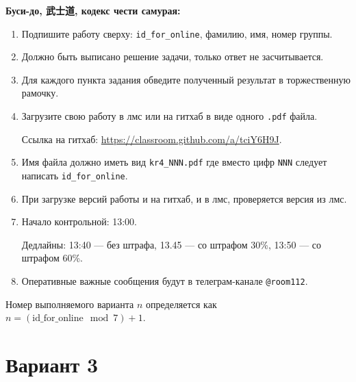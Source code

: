 \documentclass[12pt]{article}
\newcommand \id {\mathrm{id}\_\mathrm{for}\_\mathrm{online}}
\begin{document}
\textbf{Буси-до, 武士道, кодекс чести самурая:}

\vspace{5mm}

\begin{enumerate}
\item Подпишите работу сверху: \verb|id_for_online|, фамилию, имя, номер группы.
\item Должно быть выписано решение задачи, только ответ не засчитывается.
\item Для каждого пункта задания обведите полученный результат в торжественную рамочку.
\item Загрузите свою работу в лмс или на гитхаб в виде одного \verb|.pdf| файла.

Ссылка на гитхаб: \url{https://classroom.github.com/a/tciY6H9J}.
\item Имя файла должно иметь вид \verb|kr4_NNN.pdf| где вместо цифр \verb|NNN| следует написать \verb|id_for_online|.
\item При загрузке версий работы и на гитхаб, и в лмс, проверяется версия из лмс. 
\item Начало контрольной: 13:00. 

Дедлайны: 13:40 — без штрафа, 13.45 — со штрафом 30\%, 13:50 — со штрафом 60\%.
\item Оперативные важные сообщения будут в телеграм-канале \verb|@room112|.
\end{enumerate}



\newpage
Номер выполняемого варианта $n$ определяется как $n=(\id \mod 7)+1$. 

\section*{Вариант 3}
\end{document}
